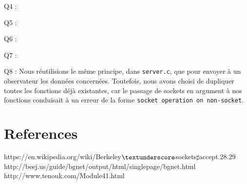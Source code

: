 \documentclass[a4paper]{article}
\begin{document}
Q4 :
\bigskip

Q5 :
\bigskip

Q6 :
\bigskip

Q7 :
\bigskip

Q8 : Nous réutilisions le même principe, dans \texttt{server.c}, que pour envoyer à un observateur les données concernées. Toutefois, nous avons choisi de dupliquer toutes les fonctions déjà existantes, car le passage de sockets en argument à nos fonctions conduisait à un erreur de la forme \texttt{socket operation on non-socket}.
\bigskip

\section{References}
https://en.wikipedia.org/wiki/Berkeley$\textunderscore$sockets$\sharp$accept.28.29
http://beej.us/guide/bgnet/output/html/singlepage/bgnet.html
http://www.tenouk.com/Module41.html
\end{document}
